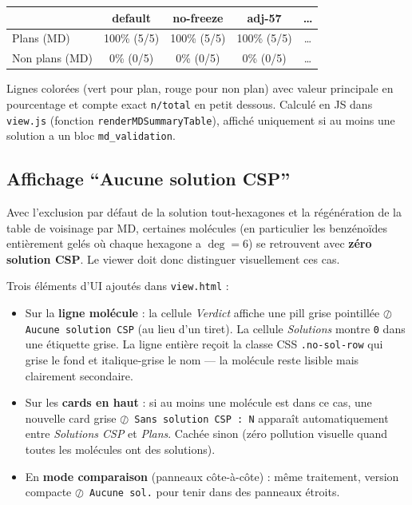 \begin{center}
\begin{tabular}{lcccc}
  \toprule
                     & default       & no-freeze     & adj-57       & \ldots \\
  \midrule
  \bucketplane{} Plans (MD)    & 100\% (5/5) & 100\% (5/5) & 100\% (5/5) & \ldots \\
  \bucketnonplane{} Non plans (MD) & 0\% (0/5)   & 0\% (0/5)   & 0\% (0/5)   & \ldots \\
  \bottomrule
\end{tabular}
\end{center}

Lignes colorées (vert pour plan, rouge pour non plan) avec valeur principale en pourcentage
et compte exact \texttt{n/total} en petit dessous. Calculé en JS dans \texttt{view.js}
(fonction \texttt{renderMDSummaryTable}), affiché uniquement si au moins une solution a un
bloc \texttt{md\_validation}.

\subsection{Affichage ``Aucune solution CSP''}


Avec l'exclusion par défaut de la solution tout-hexagones et la régénération de la
table de voisinage par MD, certaines molécules (en particulier les benzénoïdes
entièrement gelés où chaque hexagone a $\deg=6$) se retrouvent avec \textbf{zéro
solution CSP}. Le viewer doit donc distinguer visuellement ces cas.

Trois éléments d'UI ajoutés dans \texttt{view.html} :

\begin{itemize}
  \item Sur la \textbf{ligne molécule} : la cellule \emph{Verdict} affiche une pill
    grise pointillée \texttt{$\oslash$ Aucune solution CSP} (au lieu d'un tiret).
    La cellule \emph{Solutions} montre \texttt{0} dans une étiquette grise. La
    ligne entière reçoit la classe CSS \texttt{.no-sol-row} qui grise le fond et
    italique-grise le nom — la molécule reste lisible mais clairement secondaire.
  \item Sur les \textbf{cards en haut} : si au moins une molécule est dans ce cas,
    une nouvelle card grise \texttt{$\oslash$ Sans solution CSP : N} apparaît
    automatiquement entre \emph{Solutions CSP} et \emph{Plans}. Cachée sinon
    (zéro pollution visuelle quand toutes les molécules ont des solutions).
  \item En \textbf{mode comparaison} (panneaux côte-à-côte) : même traitement,
    version compacte \texttt{$\oslash$ Aucune sol.} pour tenir dans des panneaux
    étroits.
\end{itemize}

